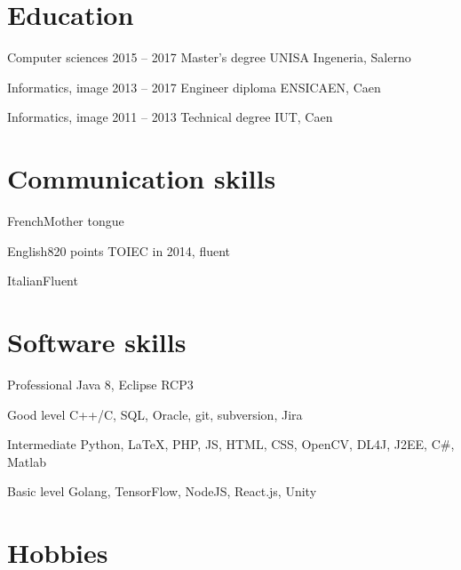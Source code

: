 \documentclass{tccv-master/tccv}
\begin{document}
\section{Education}

\begin{yearlist}

\item[Computer sciences]{2015 -- 2017}
     {Master's degree}
     {UNISA Ingeneria, Salerno}

\item[Informatics, image]{2013 -- 2017}
     {Engineer diploma}
     {ENSICAEN, Caen}

\item[Informatics, image]{2011 -- 2013}
     {Technical degree}
     {IUT, Caen}

\end{yearlist}

\section{Communication skills}

\begin{factlist}
\item{French}{Mother tongue}
\item{English}{820 points TOIEC in 2014, fluent}
\item{Italian}{Fluent}
\end{factlist}

\section{Software skills}

\begin{factlist}

\item{Professional}
	{Java 8, Eclipse RCP3}
\item{Good level}
     {C++/C, SQL, Oracle, git, subversion, Jira}

\item{Intermediate}
     {Python, \LaTeX, PHP, JS, HTML, CSS, OpenCV, DL4J, J2EE, C\#, Matlab}

\item{Basic level}
     {Golang, TensorFlow, NodeJS, React.js, Unity}

\end{factlist}

\section{Hobbies}
\end{document}
